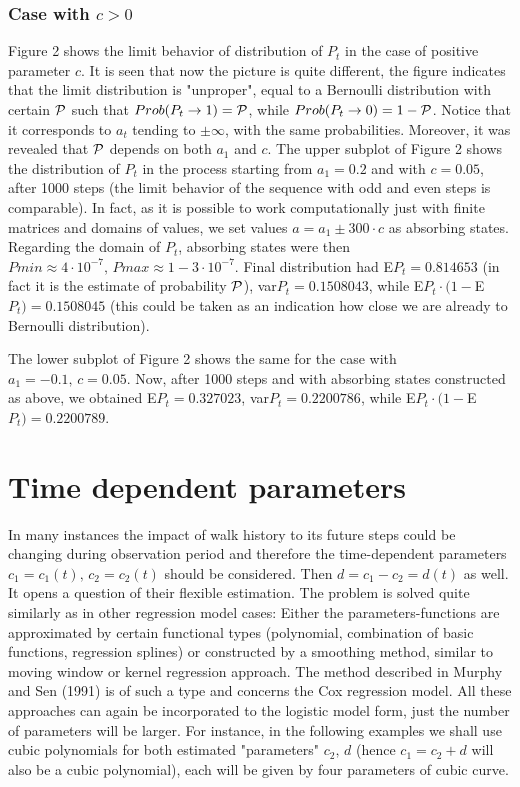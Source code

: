 \documentclass[11pt]{article}
\begin{document}
\subsubsection{Case with $c>0$}

Figure 2 shows the limit behavior of distribution of $P_t$ in the case of positive parameter $c$. 
It is seen that now the picture is quite different, the figure indicates that the limit distribution is
"unproper", equal to a Bernoulli distribution with certain $\cal{P}$ such that $Prob(P_t\to 1)=\cal{P}$, while $Prob(P_t\to 0)=1-\cal{P}$. 
Notice that it corresponds to $a_t$ tending to $\pm \infty$, with the same probabilities.
Moreover, it was revealed that $\cal{P}$ depends on both $a_1$ and $c$.
The upper subplot of Figure 2 shows the distribution of $P_t$ in 
the process starting from $a_1=0.2$ and with $c=0.05$, after 1000 steps 
(the limit behavior of the sequence with odd and even steps is comparable).
In fact, as it is possible to work computationally just with finite matrices and domains of values, we set values
$a=a_1\pm 300\cdot c$ as absorbing states. Regarding the domain of $P_t$, absorbing states were then
$Pmin\approx 4\cdot 10^{-7},\, Pmax\approx 1-3\cdot 10^{-7}$. Final distribution had
E$P_t = 0.814653$ (in fact it is the estimate of probability $\cal{P}$), var$P_t=0.1508043$, while E$P_t\cdot (1-$E$P_t)=0.1508045$ 
(this could be taken as an indication how close we are already to Bernoulli distribution).

The lower subplot of Figure 2 shows the same for the case with $a_1=-0.1,\,c=0.05$.
Now, after 1000 steps and with absorbing states constructed as above, we obtained
E$P_t = 0.327023$, var$P_t=0.2200786$, while E$P_t\cdot (1-$E$P_t)=0.2200789$.


\section{Time dependent parameters}

In many instances the impact of walk history
to its future steps could be changing during observation period and
therefore the time-dependent parameters $c_1=c_1(t),\,c_2=c_2(t)$
should be considered. Then $d=c_1-c_2=d(t)$ as well. It opens a
question of their flexible estimation. The problem is solved quite
similarly as in other regression model cases: Either the
parameters-functions are approximated by certain functional types
(polynomial, combination of basic functions, regression splines)
or constructed by a smoothing method, similar to moving window or
kernel regression approach. The method described in Murphy and Sen
(1991) is of such a type and  concerns the Cox regression model. All these approaches can again be
incorporated to the logistic model form, just the number of
parameters will be larger. For instance, in the following examples
we shall use cubic polynomials for both estimated "parameters"
$c_2,\, d$ (hence $c_1=c_2+d$ will also be a cubic polynomial),
each will be given by four parameters of cubic curve.
\end{document}
